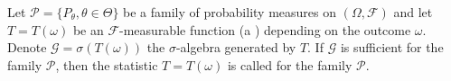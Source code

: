 Let $\mathcal{P} = \{P_{\theta}, \theta \in \Theta\}$ be a family of probability measures on $(\Omega, \mathcal{F})$ and let $T = T(\omega)$ be an $\mathcal{F}$-measurable function (a ) depending on the outcome $\omega$. Denote $\mathcal{G} = \sigma(T(\omega))$ the $\sigma$-algebra generated by $T$. If $\mathcal{G}$ is sufficient for the family $\mathcal{P}$, then the statistic $T = T(\omega)$ is called  for the family $\mathcal{P}$.
